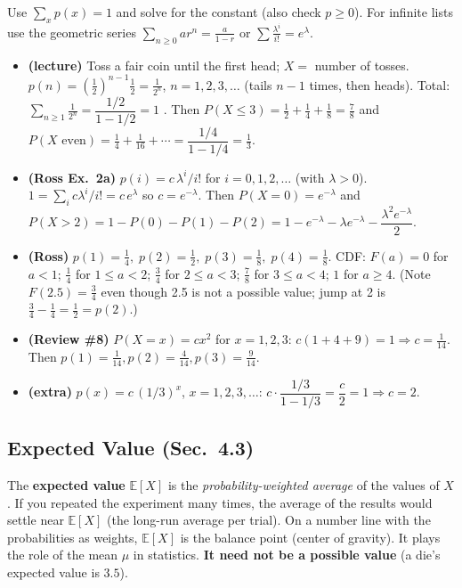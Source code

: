 \documentclass[11pt]{article}
\let\oldsubsection\subsection
\renewcommand{\subsection}{\Needspace{14\baselineskip}\oldsubsection}
\newcommand{\E}{\mathbb{E}}
\begin{document}
\begin{methodbox}
Use $\sum_xp(x)=1$ and solve for the constant (also check $p\ge0$). For infinite lists use the geometric series $\sum_{n\ge0}ar^n=\frac a{1-r}$ or $\sum\frac{\lambda^i}{i!}=e^\lambda$.
\end{methodbox}

\begin{exbox}[Examples]
\begin{itemize}
\item \textbf{(lecture)} Toss a fair coin until the first head; $X=$ number of tosses. $p(n)=\left(\tfrac12\right)^{n-1}\tfrac12=\tfrac1{2^n}$, $n=1,2,3,\dots$ (tails $n-1$ times, then heads). Total: $\sum_{n\ge1}\tfrac1{2^n}=\dfrac{1/2}{1-1/2}=1$ \checkmark. Then $P(X\le3)=\tfrac12+\tfrac14+\tfrac18=\tfrac78$ and $P(X\text{ even})=\tfrac14+\tfrac1{16}+\cdots=\dfrac{1/4}{1-1/4}=\tfrac13$.
\item \textbf{(Ross Ex.\ 2a)} $p(i)=c\,\lambda^i/i!$ for $i=0,1,2,\dots$ (with $\lambda>0$). $1=\sum_ic\lambda^i/i!=c\,e^\lambda$ so $c=e^{-\lambda}$. Then $P(X=0)=e^{-\lambda}$ and $P(X>2)=1-P(0)-P(1)-P(2)=1-e^{-\lambda}-\lambda e^{-\lambda}-\dfrac{\lambda^2e^{-\lambda}}2$.
\item \textbf{(Ross)} $p(1)=\tfrac14,\;p(2)=\tfrac12,\;p(3)=\tfrac18,\;p(4)=\tfrac18$. CDF: $F(a)=0$ for $a<1$; $\tfrac14$ for $1\le a<2$; $\tfrac34$ for $2\le a<3$; $\tfrac78$ for $3\le a<4$; $1$ for $a\ge4$. (Note $F(2.5)=\tfrac34$ even though 2.5 is not a possible value; jump at 2 is $\tfrac34-\tfrac14=\tfrac12=p(2)$.)
\item \textbf{(Review \#8)} $P(X=x)=cx^2$ for $x=1,2,3$: $c(1+4+9)=1\Rightarrow c=\tfrac1{14}$. Then $p(1)=\tfrac1{14},p(2)=\tfrac4{14},p(3)=\tfrac9{14}$.
\item \textbf{(extra)} $p(x)=c\,(1/3)^x$, $x=1,2,3,\dots$: $c\cdot\dfrac{1/3}{1-1/3}=\dfrac c2=1\Rightarrow c=2$.
\end{itemize}
\end{exbox}

\subsection{Expected Value (Sec.\ 4.3)}

\begin{ideabox}
The \textbf{expected value} $\E[X]$ is the \emph{probability-weighted average} of the values of $X$. If you repeated the experiment many times, the average of the results would settle near $\E[X]$ (the long-run average per trial). On a number line with the probabilities as weights, $\E[X]$ is the balance point (center of gravity). It plays the role of the mean $\mu$ in statistics. \textbf{It need not be a possible value} (a die's expected value is $3.5$).
\end{ideabox}
\end{document}
